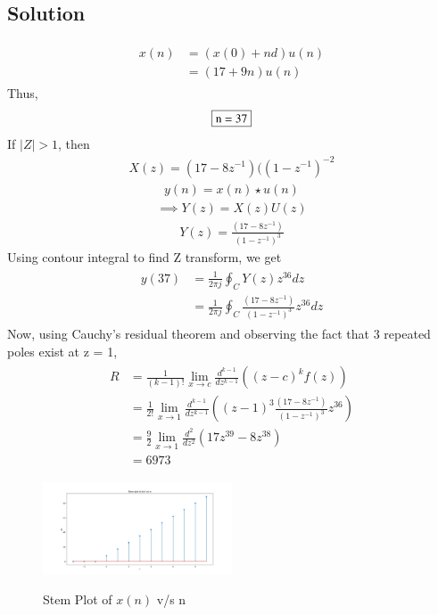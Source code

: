 \documentclass[journal,12pt,twocolumn]{IEEEtran}
\theoremstyle{remark}
\begin{document}
\subsection{Solution}
\begin{table}[ht]

\end{table}
\begin{align}
\begin{aligned}
\label{eq:1}x(n) &= (x(0) + nd)u(n)\\
&=(17+9n)u(n)
\end{aligned}
\end{align}
Thus,
$$\fbox{n = 37}$$
If $|Z|>1$, then
\begin{align}\label{8}X(z) = (17-8z^{-1})({(1-z^{-1})}^{-2}\end{align}
\begin{align}y(n) = x(n) \star u(n)\end{align}
\begin{align}\implies Y(z) = X(z)U(z)\end{align}
\begin{align}Y(z) = \frac{(17-8z^{-1})}{(1-z^{-1})^{3}}\end{align}
\bigskip
Using contour integral to find Z transform, we get
\begin{align}
\begin{aligned}
    y(37) &= \frac{1}{2\pi j} \oint _C Y(z)z^{36}dz\\
    &= \frac{1}{2\pi j} \oint _C \frac{(17-8z^{-1})}{(1-z^{-1})^{3}}z^{36}dz
\end{aligned}
\end{align}
Now, using Cauchy's residual theorem and observing the fact that 3 repeated poles exist at z = 1, 
\begin{align}
\begin{aligned}
    R &= \frac{1}{(k-1)!}\lim_{x \to c}\frac{d^{k-1}}{dz^{k-1}}((z-c)^kf(z))\\
    &= \frac{1}{2!}\lim_{x \to 1}\frac{d^{k-1}}{dz^{k-1}}((z-1)^3\frac{(17-8z^{-1})}{(1-z^{-1})^{3}}z^{36})\\
    &=\frac{9}{2}\lim_{x \to 1}\frac{d^2}{dz^2}(17z^{39} - 8z^{38})\\
    &= 6973
\end{aligned}
\end{align}
\begin{flushleft}
\begin{figure}[h]
\renewcommand\thefigure{1}
    \caption{Stem Plot of $x(n)$ v/s n}
    \includegraphics[width=0.5\textwidth]{figs/x(n)_plot.png}
    \label{fig:stem-plot}
\end{figure}
\end{flushleft}
\end{document}
